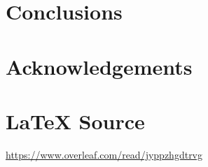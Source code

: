 \documentclass{article}
\theoremstyle{definition}
\begin{document}
%
% 
% 
%
%
%
\section{Conclusions}
\label{section:conclusions}
%
%
%
\section*{Acknowledgements}
\label{section:acknowledgements}
%
%
\section*{\LaTeX \hspace{0.025 mm} Source}
\url{https://www.overleaf.com/read/jyppzhgdtrvg}
%
%
%


%
%
%
%
%
\end{document}
